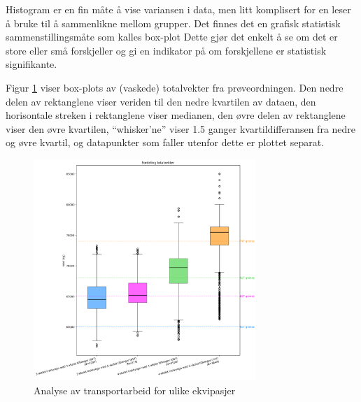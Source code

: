 \begin{formal}
Histogram er en fin måte å vise variansen i data, men litt komplisert for en leser å bruke til å sammenlikne mellom grupper. Det finnes det en grafisk statistisk sammenstillingsmåte som kalles box-plot
Dette gjør det enkelt å se om det er store eller små forskjeller og gi en indikator på om forskjellene er statistisk signifikante.
\end{formal}

Figur \ref{fig:boxplot_totalweights} viser box-plots av (vaskede) totalvekter fra prøveordningen.
Den nedre delen av rektanglene viser veriden til den nedre kvartilen av dataen, den horisontale streken i rektanglene viser medianen,
den øvre delen av rektanglene viser den øvre kvartilen, \enquote{whisker'ne} viser 1.5 ganger kvartildifferansen fra nedre og øvre kvartil, og datapunkter som
faller utenfor dette er plottet separat.

\begin{figure}[H]
    \centering
    \includegraphics[width=0.75\textwidth]{images/boxplot_totalweights.png}
    \caption{Analyse av transportarbeid for ulike ekvipasjer}
    \label{fig:boxplot_totalweights}
\end{figure}
